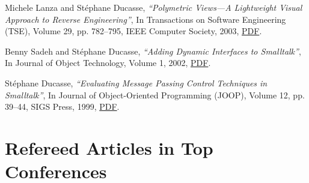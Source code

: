 \documentclass{article}
\newcommand{\czauthors}[1]{#1}
\newcommand{\cztitle}[1]{\emph{``#1''}}
\newcommand{\czjournal}[1]{#1}
\begin{document}
\begin{itemize}
	\pub  \czauthors{Michele Lanza and St\'ephane Ducasse},  \cztitle{Polymetric Views---A Lightweight Visual Approach to Reverse Engineering},  In \czjournal{Transactions on Software Engineering (TSE)}, Volume 29, pp. 782--795, IEEE Computer Society, 2003, \href{http://rmod-files.lille.inria.fr/Team/Texts/Papers/Lanz03dTSEPolymetric.pdf}{PDF}.

	\pub  \czauthors{Benny Sadeh and St\'ephane Ducasse},  \cztitle{Adding Dynamic Interfaces to {Smalltalk}},  In \czjournal{Journal of Object Technology}, Volume 1, 2002, \href{http://rmod-files.lille.inria.fr/Team/Texts/Papers/Sade02aDynamicInterfaces.pdf}{PDF}.

	\pub  \czauthors{St\'ephane Ducasse},  \cztitle{Evaluating Message Passing Control Techniques in {Smalltalk}},  In \czjournal{Journal of Object-Oriented Programming (JOOP)}, Volume 12, pp. 39--44, SIGS Press, 1999, \href{http://rmod-files.lille.inria.fr/Team/Texts/Papers/Duca99aMsgPassingControl.pdf}{PDF}.

\end{itemize}\section{Refereed Articles in Top Conferences}
\end{document}
